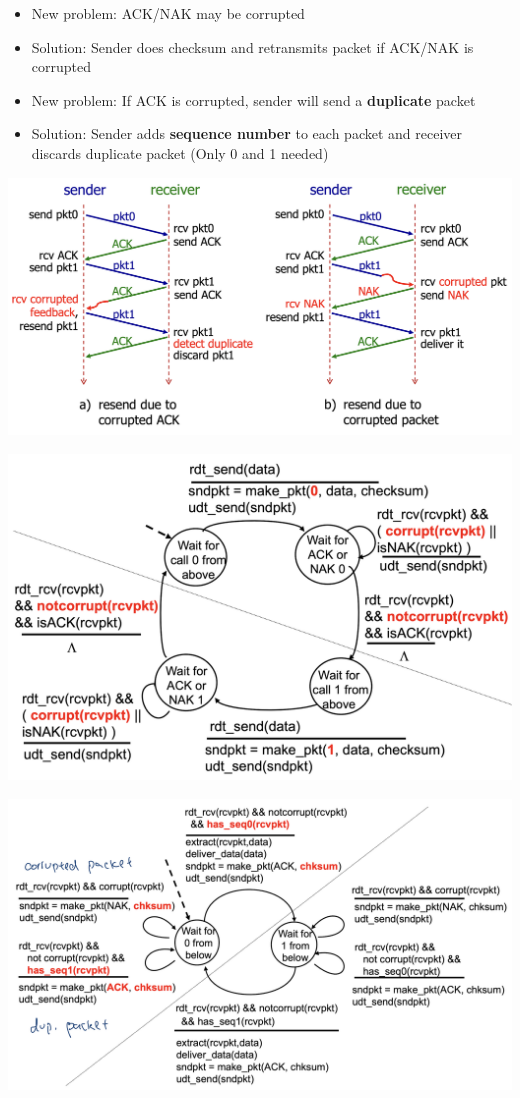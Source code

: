 \documentclass{article}
\begin{document}
\begin{multicols*}{3}
\begin{itemize}
    \item New problem: ACK/NAK may be corrupted
    \item Solution: Sender does checksum and retransmits packet if ACK/NAK is corrupted
    \item New problem: If ACK is corrupted, sender will send a \textbf{duplicate} packet
    \item Solution: Sender adds \textbf{sequence number} to each packet and receiver discards duplicate packet (Only 0 and 1 needed)
\end{itemize}

\includegraphics[scale=0.2]{rdt-2.1}

\includegraphics[scale=0.2]{rdt-2.1-sender-fsm}

\includegraphics[scale=0.2]{rdt-2.1-receiver-fsm}


\end{multicols*}
\end{document}

